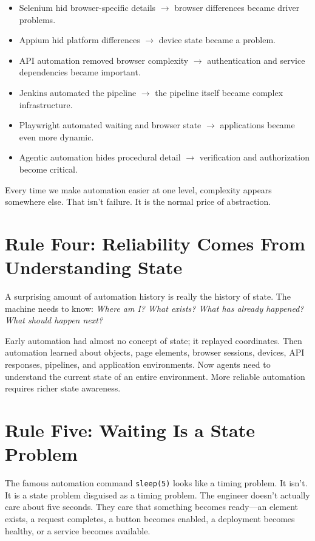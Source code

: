 \documentclass[11pt,twoside]{book}
\begin{document}
\begin{itemize}[nosep]
    \item Selenium hid browser-specific details $\rightarrow$ browser differences became driver problems.
    \item Appium hid platform differences $\rightarrow$ device state became a problem.
    \item API automation removed browser complexity $\rightarrow$ authentication and service dependencies became important.
    \item Jenkins automated the pipeline $\rightarrow$ the pipeline itself became complex infrastructure.
    \item Playwright automated waiting and browser state $\rightarrow$ applications became even more dynamic.
    \item Agentic automation hides procedural detail $\rightarrow$ verification and authorization become critical.
\end{itemize}

Every time we make automation easier at one level, complexity appears somewhere else. That isn't failure. It is the normal price of abstraction.

\section*{Rule Four: Reliability Comes From Understanding State}

A surprising amount of automation history is really the history of state. The machine needs to know: \emph{Where am I? What exists? What has already happened? What should happen next?}

Early automation had almost no concept of state; it replayed coordinates. Then automation learned about objects, page elements, browser sessions, devices, API responses, pipelines, and application environments. Now agents need to understand the current state of an entire environment. More reliable automation requires richer state awareness.

\section*{Rule Five: Waiting Is a State Problem}

The famous automation command \texttt{sleep(5)} looks like a timing problem. It isn't. It is a state problem disguised as a timing problem. The engineer doesn't actually care about five seconds. They care that something becomes ready---an element exists, a request completes, a button becomes enabled, a deployment becomes healthy, or a service becomes available.
\end{document}
